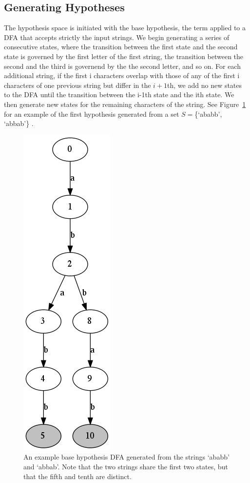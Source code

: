 \documentclass[10pt,letterpaper]{article}
\begin{document}
\subsection{Generating Hypotheses}
The hypothesis space is initiated with the base hypothesis, the term applied to a DFA that accepts strictly the input strings. We begin generating a series of consecutive states, where the transition between the first state and the second state is governed by the first letter of the first string, the transition between the second and the third is governend by the the second letter, and so on. For each additional string, if the first i characters overlap with those of any of the first i characters of one previous string but differ in the $i+1$th, we add no new states to the DFA until the transition between the i-1th state and the ith state. We then generate new states for the remaining characters of the string. See Figure~\ref{base_hypothesis} for an example of the first hypothesis generated from a set $S = $\{`ababb', `abbab'\} .
  \begin{figure}[ht]
\begin{center}
\includegraphics[scale=0.4]{base_hypothesis.png}
\end{center}
\caption{An example base hypothesis DFA generated from the strings `ababb' and `abbab'. Note that the two strings share the first two states, but that the fifth and tenth are distinct.} 
\label{base_hypothesis}
\end{figure}
\end{document}
